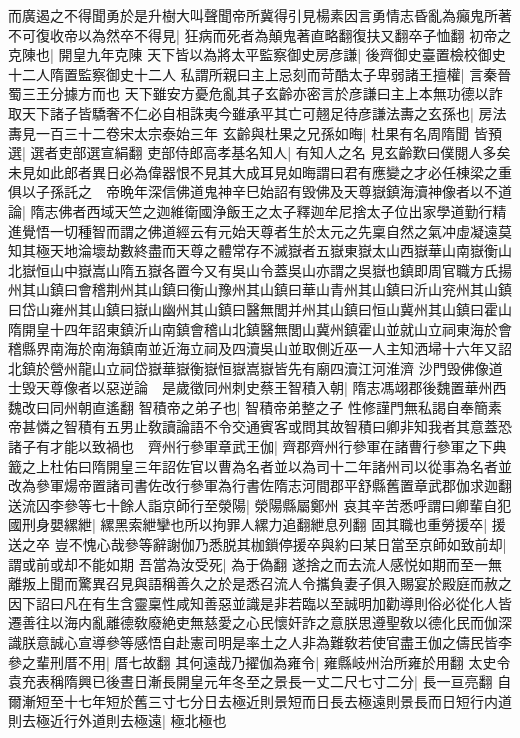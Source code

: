 而廣遏之不得聞勇於是升樹大叫聲聞帝所冀得引見楊素因言勇情志昏亂為癲鬼所著不可復收帝以為然卒不得見|{
	狂病而死者為顛鬼著直略翻復扶又翻卒子恤翻}
初帝之克陳也|{
	開皇九年克陳}
天下皆以為將太平監察御史房彦謙|{
	後齊御史臺置檢校御史十二人隋置監察御史十二人}
私謂所親曰主上忌刻而苛酷太子卑弱諸王擅權|{
	言秦晉蜀三王分據方而也}
天下雖安方憂危亂其子玄齡亦密言於彦謙曰主上本無功德以詐取天下諸子皆驕奢不仁必自相誅夷今雖承平其亡可翹足待彦謙法夀之玄孫也|{
	房法夀見一百三十二卷宋太宗泰始三年}
玄齡與杜果之兄孫如晦|{
	杜果有名周隋聞}
皆預選|{
	選者吏部選宣絹翻}
吏部侍郎高孝基名知人|{
	有知人之名}
見玄齡歎曰僕閱人多矣未見如此郎者異日必為偉器恨不見其大成耳見如晦謂曰君有應變之才必任棟梁之重俱以子孫託之　帝晩年深信佛道鬼神辛巳始詔有毁佛及天尊嶽鎮海瀆神像者以不道論|{
	隋志佛者西域天竺之迦維衛國浄飯王之太子釋迦牟尼捨太子位出家學道勤行精進覺悟一切種智而謂之佛道經云有元始天尊者生於太元之先稟自然之氣冲虛凝遠莫知其極天地淪壞劫數終盡而天尊之體常存不滅嶽者五嶽東嶽太山西嶽華山南嶽衡山北嶽恒山中嶽嵩山隋五嶽各置今又有吳山令蓋吳山亦謂之吳嶽也鎮即周官職方氏揚州其山鎮曰會稽荆州其山鎮曰衡山豫州其山鎮曰華山青州其山鎮曰沂山兖州其山鎮曰岱山雍州其山鎮曰嶽山幽州其山鎮曰醫無閭并州其山鎮曰恒山冀州其山鎮曰霍山隋開皇十四年詔東鎮沂山南鎮會稽山北鎮醫無閭山冀州鎮霍山並就山立祠東海於會稽縣界南海於南海鎮南並近海立祠及四瀆吳山並取側近巫一人主知洒埽十六年又詔北鎮於營州龍山立祠岱嶽華嶽衡嶽恒嶽嵩嶽皆先有廟四瀆江河淮濟}
沙門毁佛像道士毁天尊像者以惡逆論　是歲徵同州刺史蔡王智積入朝|{
	隋志馮翊郡後魏置華州西魏改曰同州朝直遙翻}
智積帝之弟子也|{
	智積帝弟整之子}
性修謹門無私謁自奉簡素帝甚憐之智積有五男止敎讀論語不令交通賓客或問其故智積曰卿非知我者其意蓋恐諸子有才能以致禍也　齊州行參軍章武王伽|{
	齊郡齊州行參軍在諸曹行參軍之下典籖之上杜佑曰隋開皇三年詔佐官以曹為名者並以為司十二年諸州司以從事為名者並改為參軍煬帝置諸司書佐改行參軍為行書佐隋志河間郡平舒縣舊置章武郡伽求迦翻}
送流囚李參等七十餘人詣京師行至滎陽|{
	滎陽縣屬鄭州}
哀其辛苦悉呼謂曰卿輩自犯國刑身嬰縲紲|{
	縲黑索紲攣也所以拘罪人縲力追翻紲息列翻}
固其職也重勞援卒|{
	援送之卒}
豈不愧心哉參等辭謝伽乃悉脱其枷鎖停援卒與約曰某日當至京師如致前却|{
	謂或前或却不能如期}
吾當為汝受死|{
	為于偽翻}
遂捨之而去流人感悦如期而至一無離叛上聞而驚異召見與語稱善久之於是悉召流人令攜負妻子俱入賜宴於殿庭而赦之因下詔曰凡在有生含靈稟性咸知善惡並識是非若臨以至誠明加勸導則俗必從化人皆遷善往以海内亂離德敎廢絶吏無慈愛之心民懷奸詐之意朕思遵聖敎以德化民而伽深識朕意誠心宣導參等感悟自赴憲司明是率土之人非為難敎若使官盡王伽之儔民皆李參之輩刑厝不用|{
	厝七故翻}
其何遠哉乃擢伽為雍令|{
	雍縣岐州治所雍於用翻}
太史令袁充表稱隋興已後晝日漸長開皇元年冬至之景長一丈二尺七寸二分|{
	長一亘亮翻}
自爾漸短至十七年短於舊三寸七分日去極近則景短而日長去極遠則景長而日短行内道則去極近行外道則去極遠|{
	極北極也}

